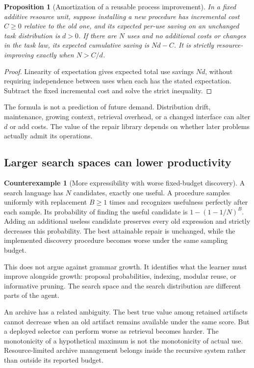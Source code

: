 \documentclass[11pt,letterpaper]{article}
\theoremstyle{plain}
\newtheorem{proposition}[theorem]{Proposition}
\theoremstyle{definition}
\newtheorem{counterexample}[theorem]{Counterexample}
\begin{document}
\begin{proposition}[Amortization of a reusable process improvement]\label{prop:amortization}
In a fixed additive resource unit, suppose installing a new procedure has incremental cost $C\geq0$ relative to the old one, and its expected per-use saving on an unchanged task distribution is $d>0$. If there are $N$ uses and no additional costs or changes in the task law, its expected cumulative saving is $Nd-C$. It is strictly resource-improving exactly when $N>C/d$.
\end{proposition}
\begin{proof}
Linearity of expectation gives expected total use savings $Nd$, without requiring independence between uses when each has the stated expectation. Subtract the fixed incremental cost and solve the strict inequality.
\end{proof}

The formula is not a prediction of future demand. Distribution drift, maintenance, growing context, retrieval overhead, or a changed interface can alter $d$ or add costs. The value of the repair library depends on whether later problems actually admit its operations.

\subsection{Larger search spaces can lower productivity}
\begin{counterexample}[More expressibility with worse fixed-budget discovery]\label{ex:dilution}
A search language has $N$ candidates, exactly one useful. A procedure samples uniformly with replacement $B\geq1$ times and recognizes usefulness perfectly after each sample. Its probability of finding the useful candidate is $1-(1-1/N)^B$. Adding an additional useless candidate preserves every old expression and strictly decreases this probability. The best attainable repair is unchanged, while the implemented discovery procedure becomes worse under the same sampling budget.
\end{counterexample}

This does not argue against grammar growth. It identifies what the learner must improve alongside growth: proposal probabilities, indexing, modular reuse, or informative pruning. The search space and the search distribution are different parts of the agent.

An archive has a related ambiguity. The best true value among retained artifacts cannot decrease when an old artifact remains available under the same score. But a deployed selector can perform worse as retrieval becomes harder. The monotonicity of a hypothetical maximum is not the monotonicity of actual use. Resource-limited archive management belongs inside the recursive system rather than outside its reported budget.
\end{document}
